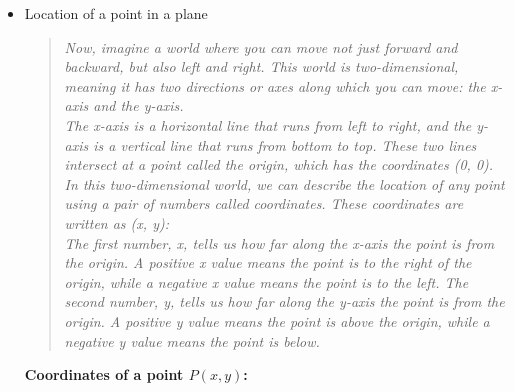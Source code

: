 \documentclass{article}
\begin{document}
\begin{itemize}
    \item Location of a point in a plane
    \begin{quote}
        \textit{
            Now, imagine a world where you can move not just forward and backward, but also left and right. This world is two-dimensional, meaning it has two directions or axes along which you can move: the x-axis and the y-axis.\\[2mm]
            The x-axis is a horizontal line that runs from left to right, and the y-axis is a vertical line that runs from bottom to top. These two lines intersect at a point called the origin, which has the coordinates (0, 0).
            In this two-dimensional world, we can describe the location of any point using a pair of numbers called coordinates. These coordinates are written as (x, y):\\[2mm]
            The first number, x, tells us how far along the x-axis the point is from the origin. A positive x value means the point is to the right of the origin, while a negative x value means the point is to the left.
            The second number, y, tells us how far along the y-axis the point is from the origin. A positive y value means the point is above the origin, while a negative y value means the point is below.
        }
    \end{quote}

        \begin{center}
        \end{center}

        \textbf{Coordinates of a point $P(x, y)$:} \\
        

\end{itemize}
\end{document}
